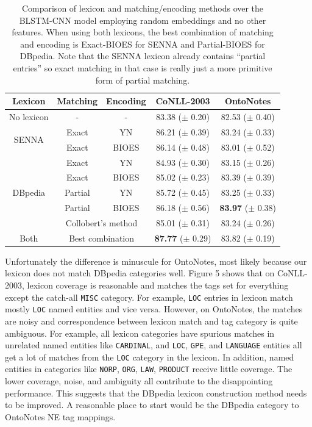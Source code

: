 \documentclass[11pt,letterpaper]{article}
\begin{document}
\begin{table}[t]
\begin{center}
\small
\begin{tabular}{|c|c|c|c|c|}
\hline \bf Lexicon & \bf Matching & \bf Encoding & \bf CoNLL-2003 & \bf OntoNotes \\ \hline
No lexicon & - & - & 83.38 ($\pm$ 0.20) & 82.53 ($\pm$ 0.40) \\ \hline
\multirow{2}{*}{SENNA}
 & Exact   & YN    & 86.21 ($\pm$ 0.39) & 83.24 ($\pm$ 0.33) \\ 
 & Exact   & BIOES & 86.14 ($\pm$ 0.48) & 83.01 ($\pm$ 0.52) \\ \hline
\multirow{5}{*}{DBpedia}
 & Exact   & YN    & 84.93 ($\pm$ 0.30) & 83.15 ($\pm$ 0.26) \\
 & Exact   & BIOES & 85.02 ($\pm$ 0.23) & 83.39 ($\pm$ 0.39) \\
 & Partial & YN    & 85.72 ($\pm$ 0.45) & 83.25 ($\pm$ 0.33) \\
 & Partial & BIOES & 86.18 ($\pm$ 0.56) & {\bf 83.97} ($\pm$ 0.38) \\ \cline{2-5}
 & \multicolumn{2}{|c|}{Collobert's method} & 85.01 ($\pm$ 0.31) & 83.24 ($\pm$ 0.26) \\ \hline
Both & \multicolumn{2}{|c|}{Best combination} & {\bf 87.77} ($\pm$ 0.29) & 83.82 ($\pm$ 0.19) \\
\hline
\end{tabular}
\end{center}
\caption{Comparison of lexicon and matching/encoding methods over the BLSTM-CNN model employing random embeddings and no other features. When using both lexicons, the best combination of matching and encoding is Exact-BIOES for SENNA and Partial-BIOES for DBpedia. Note that the SENNA lexicon already contains ``partial entries'' so exact matching in that case is really just a more primitive form of partial matching.}
\label{tab:lexicon-res}
\end{table}

Unfortunately the difference is minuscule for OntoNotes, most likely because our lexicon does not match DBpedia categories well. Figure 5 shows that on CoNLL-2003, lexicon coverage is reasonable and matches the tags set for everything except the catch-all \texttt{MISC} category. For example, \texttt{LOC} entries in lexicon match mostly \texttt{LOC} named entities and vice versa. However, on OntoNotes, the matches are noisy and correspondence between lexicon match and tag category is quite ambiguous. For example, all lexicon categories have spurious matches in unrelated named entities like \texttt{CARDINAL}, and \texttt{LOC}, \texttt{GPE}, and \texttt{LANGUAGE} entities all get a lot of matches from the \texttt{LOC} category in the lexicon. In addition, named entities in categories like \texttt{NORP}, \texttt{ORG}, \texttt{LAW}, \texttt{PRODUCT} receive little coverage. The lower coverage, noise, and ambiguity all contribute to the disappointing performance. This suggests that the DBpedia lexicon construction method needs to be improved. A reasonable place to start would be the DBpedia category to OntoNotes NE tag mappings.
\end{document}
